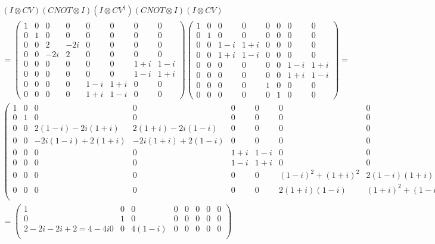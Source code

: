 \documentclass[10pt]{article}
\begin{document}
\begin{align*}
(I \otimes CV)(CNOT \otimes I)(I \otimes CV^{\dag})(CNOT \otimes I)(I \otimes CV) \\
=
\begin{pmatrix}
1 & 0 & 0    & 0      & 0    & 0 & 0     & 0 \\
0 & 1 & 0    & 0      & 0    & 0 & 0     & 0 \\
0 & 0 & 2    & -2i    & 0    & 0 & 0     & 0 \\
0 & 0 & -2i & 2       & 0    & 0 & 0     & 0 \\
0 & 0 & 0    & 0       & 0    & 0 & 1+i & 1-i \\
0 & 0 & 0    & 0       & 0    & 0 & 1-i  & 1+ i \\
0 & 0 & 0    & 0       & 1-i & 1+i & 0 & 0 \\
0 & 0 & 0    & 0       & 1+i & 1-i & 0 & 0 
\end{pmatrix}
\begin{pmatrix}
1 & 0 & 0      & 0    & 0 & 0 & 0   & 0 \\
0 & 1 & 0      & 0    & 0 & 0 & 0   & 0 \\
0 & 0 & 1 - i & 1+i & 0 & 0 & 0   & 0 \\
0 & 0 & 1 +i & 1-i  & 0 & 0 & 0   & 0 \\
0 & 0 & 0     & 0     & 0 & 0 & 1-i & 1+ i \\
0 & 0 & 0     & 0     & 0 & 0 & 1+i & 1-i \\
0 & 0 & 0     & 0     & 1 & 0 & 0    & 0 \\
0 & 0 & 0     & 0     & 0 & 1 & 0    & 0 
\end{pmatrix} =\\
\begin{pmatrix}
1 & 0 & 0                        & 0                      & 0    & 0    & 0 & 0 \\
0 & 1 & 0                        & 0                      & 0    & 0    & 0 & 0 \\
0 & 0 & 2(1-i) -2i(1+i)    & 2(1+i) -2i(1-i)  & 0    & 0    & 0 & 0 \\
0 & 0 & -2i(1-i) +2(1+i) & -2i(1+i)+2(1-i) & 0    & 0    & 0 & 0 \\
0 & 0 & 0                        & 0                      & 1+i & 1-i & 0 & 0 \\
0 & 0 & 0                        & 0                      & 1-i & 1+i & 0 & 0 \\
0 & 0 & 0      			       & 0                      & 0    & 0    & (1-i)^2 + (1+i)^2 & 2(1-i)(1+i) \\
0 & 0 & 0  					   & 0 				   	   & 0    & 0    & 2(1+i)(1-i)   & (1+i)^2 + (1-i)^2 \\
\end{pmatrix} \\
= 
\begin{pmatrix}
1 & 0 & 0 & 0   & 0 & 0 & 0 & 0 \\
0 & 1 & 0 & 0   & 0 & 0 & 0 & 0 \\ 2-2i - 2i +2 = 4 - 4i
0 & 0 & 4(1 -i) & 0 & 0 & 0 & 0 & 0 \\
\end{pmatrix}
\end{align*}
\end{document}
